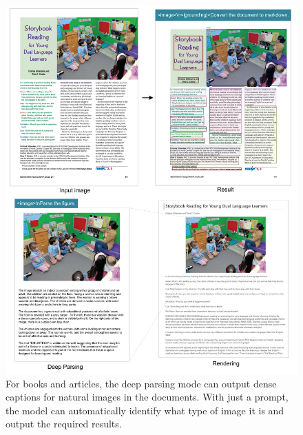 \documentclass[11pt, a4paper, logo, copyright, nonumbering]{deepseek}
\begin{document}
\begin{CJK*}{UTF8}{gbsn}
\begin{figure}[p]
	\centering
    \includegraphics[width=1.0\linewidth]{figures/6.pdf}
	\caption{For books and articles, the deep parsing mode can output dense captions for natural images in the documents. With just a prompt, the model can automatically identify what type of image it is and output the required results. }
	\label{fig:12}
\end{figure}




\end{CJK*}
\end{document}
